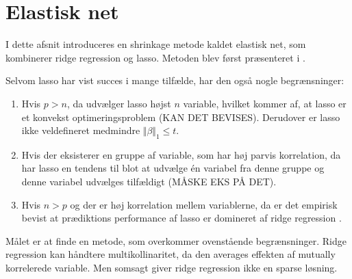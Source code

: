 \section{Elastisk net}
I dette afsnit introduceres en shrinkage metode kaldet elastisk net, som kombinerer ridge regression og lasso.
Metoden blev først præsenteret i \citep{zou_hastie}.

Selvom lasso har vist succes i mange tilfælde, har den også nogle begrænsninger:
%
\begin{enumerate}[label=\textnormal{(\arabic*)}]
    \item Hvis $p>n$, da udvælger lasso højst $n$ variable, hvilket kommer af, at lasso er et konvekst optimeringsproblem (KAN DET BEVISES). Derudover er lasso ikke veldefineret medmindre \(\Vert \beta \Vert_1 \leq t\). \label{itm:1}
    \item Hvis der eksisterer en gruppe af variable, som har høj parvis korrelation, da har lasso en tendens til blot at udvælge  én variabel fra denne gruppe og denne variabel udvælges tilfældigt (MÅSKE EKS PÅ DET). \label{itm:2}
    \item Hvis $n>p$ og der er høj korrelation mellem variablerne, da er det empirisk bevist at prædiktions performance af lasso er domineret af ridge regression \citep{lasso}.  \label{itm:3}
\end{enumerate}
%
Målet er at finde en metode, som overkommer ovenstående begrænsninger.
Ridge regression kan håndtere multikollinaritet, da den averages effekten af mutually korrelerede variable.
Men somsagt giver ridge regression ikke en sparse løsning.

